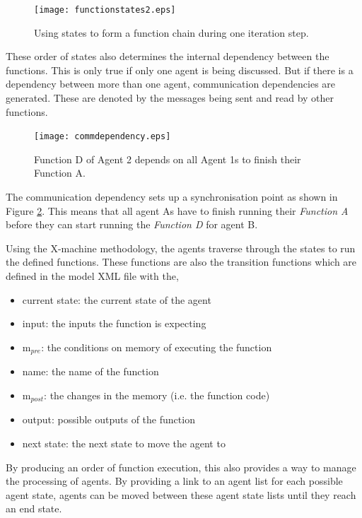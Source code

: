\documentclass[a4paper,11pt]{article}
\begin{document}
\begin{figure}[!htb]
\begin{center}
  \texttt{[image: functionstates2.eps]}
  \caption{Using states to form a function chain during one iteration step.}
  \label{fig:functionstates}
  \end{center}
\end{figure}

These order of states also determines the internal dependency
between the functions. This is only true if only one agent is being
discussed. But if there is a dependency between more than one agent,
communication dependencies are generated. These are denoted by the
messages being sent and read by other functions.



\begin{figure}[!htb]
\begin{center}
  \texttt{[image: commdependency.eps]}
  \caption{Function D of Agent 2 depends on all Agent 1s to finish their Function A.}
  \label{fig:commdependency}
  \end{center}
\end{figure}

The communication dependency sets up a synchronisation point as
shown in Figure \ref{fig:commdependency}. This means that all agent
As have to finish running their \emph{Function A} before they can
start running the \emph{Function D} for agent B.

Using the X-machine methodology, the agents traverse through the
states to run the defined functions. These functions are also the
transition functions which are defined in the model XML file with
the,

\begin{itemize}
\item current state: the current state of the agent
\item input: the inputs the function is expecting
\item m$_{pre}$: the conditions on memory of executing the function
\item name: the name of the function
\item m$_{post}$: the changes in the memory (i.e. the function code)
\item output: possible outputs of the function
\item next state: the next state to move the agent to
\end{itemize}

By producing an order of function execution, this also provides a
way to manage the processing of agents. By providing a link to an
agent list for each possible agent state, agents can be moved
between these agent state lists until they reach an end state.
\end{document}
